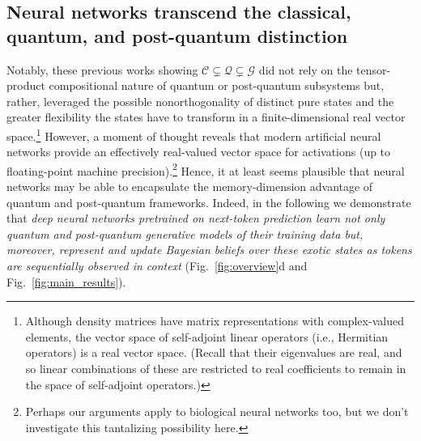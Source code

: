 \documentclass[prx,nofootinbib,onecolumn,showkeys,groupaddress,preprintnumbers,floatfix,
superscriptaddress]{revtex4-1}
\begin{document}
\subsection{Neural networks transcend the classical, quantum, and post-quantum distinction}

Notably, these previous works showing $\mathcal{C} \subsetneq \mathcal{Q} \subsetneq \mathcal{G}$ did not rely on the tensor-product compositional nature of quantum or post-quantum subsystems but, rather, leveraged the 
possible nonorthogonality of distinct pure states and the
greater flexibility the states have to transform in a finite-dimensional real vector space.\footnote{Although density matrices have matrix representations with complex-valued elements, the vector space of self-adjoint linear operators (i.e., Hermitian operators) is a real vector space.  (Recall that their eigenvalues are real, and so linear combinations of these are restricted to real coefficients to remain in the space of self-adjoint operators.)}
However, a moment of thought reveals that modern artificial neural networks provide an effectively real-valued vector space for activations (up to floating-point machine precision).\footnote{Perhaps our arguments apply to biological neural networks too, but we don't investigate this tantalizing possibility here.}
Hence, it at least seems plausible that neural networks may be able to encapsulate the memory-dimension advantage of quantum and post-quantum frameworks.
Indeed, in the following we demonstrate that 
\emph{deep neural networks pretrained on next-token prediction learn 
not only quantum and post-quantum generative models of their training data but, moreover, represent and update Bayesian beliefs over these exotic states as tokens are sequentially observed in context} (Fig.~\ref{fig:overview}d and Fig.~\ref{fig:main_results}).

\end{document}

